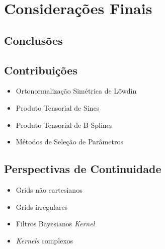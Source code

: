 \chapter{Considerações Finais} \label{cap:consideracoes}

\section{Conclusões}

\section{Contribuições}

\begin{itemize}
    \item Ortonormalização Simétrica de Löwdin
    \item Produto Tensorial de Sincs
    \item Produto Tensorial de B-Splines
    \item Métodos de Seleção de Parâmetros
\end{itemize}

\section{Perspectivas de Continuidade}

\begin{itemize}
    \item Grids não cartesianos
    \item Grids irregulares
    \item Filtros Bayesianos \textit{Kernel}
    \item \textit{Kernels} complexos
\end{itemize}
